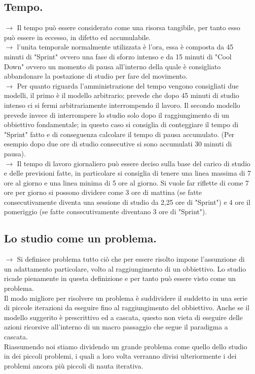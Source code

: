 \documentclass[11pt,a4paper]{article}
\begin{document}
\subsection{Tempo.}
$\rightarrow$ Il tempo può essere considerato come una risorsa tangibile, per tanto esso può essere in eccesso, in difetto ed accumulabile.\\
$\rightarrow$ l'unita temporale normalmente utilizzata è l'ora, essa è composta da 45 minuti di "Sprint" ovvero una fase di sforzo intenso e da 15 minuti di "Cool Down" ovvero un momento di pausa all'interno della quale è consigliato abbandonare la postazione di studio per fare del movimento. \\
$\rightarrow$ Per quanto riguarda l'amministrazione del tempo vengono consigliati due modelli, il primo è il  modello arbitrario; prevede che dopo 45 minuti di studio intenso ci si fermi arbitrariamente interrompendo il lavoro. Il secondo modello prevede invece di interrompere lo studio solo dopo il raggiungimento di un obbiettivo fondamentale; in questo caso si consiglia di conteggiare il tempo di "Sprint" fatto e di conseguenza calcolare il tempo di pausa accumulato. (Per esempio dopo due ore di studio consecutive si sono accumulati 30 minuti di pausa).\\
$\rightarrow$ Il tempo di lavoro giornaliero può essere deciso sulla base del carico di studio e delle previsioni fatte, in particolare si consiglia di tenere una linea massima di 7 ore al giorno e una linea minima di 5 ore al giorno. Si vuole far riflette di come 7 ore per giorno si possono dividere come 3 ore di mattina (se fatte consecutivamente diventa una sessione di studio da 2,25 ore di "Sprint") e 4 ore il pomeriggio (se fatte consecutivamente diventano 3 ore di "Sprint").\\

\subsection{Lo studio come un problema.} 
$\rightarrow$ Si definisce problema tutto ciò che per essere risolto impone l'assunzione di un adattamento particolare, volto al raggiungimento di un obbiettivo. Lo studio ricade pienamente in questa definizione e per tanto può essere visto come un problema.\\
Il modo migliore per risolvere un problema è suddividere il suddetto in una serie di piccole iterazioni da eseguire fino al raggiungimento del obbiettivo. Anche se il modello suggerito è prescrittivo ed a cascata, questo non vieta di eseguire delle azioni ricorsive all'interno di un macro passaggio che segue il paradigma a cascata.\\
Riassumendo noi stiamo dividendo un grande problema come quello dello studio in dei piccoli problemi, i quali a loro volta verranno divisi ulteriormente i dei problemi ancora più piccoli di nauta iterativa.\\ 
\end{document}
